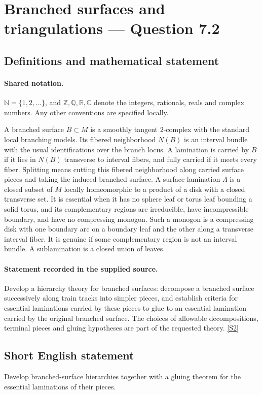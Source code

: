 \documentclass[11pt]{article}
\newcommand{\sref}[2]{\hyperlink{source:#1:#2}{[S#2]}}
\begin{document}
\section{Branched surfaces and triangulations — Question 7.2}\label{statement}

\subsection{Definitions and mathematical statement}

\paragraph{Shared notation.}$\mathbb N=\{1,2,\ldots\}$, and $\mathbb Z,\mathbb Q,\mathbb R,\mathbb C$ denote the integers, rationals, reals and complex numbers. Any other conventions are specified locally.


A branched surface $B\subset M$ is a smoothly tangent $2$-complex with the standard local branching models. Its fibered neighborhood $N(B)$ is an interval bundle with the usual identifications over the branch locus. A lamination is carried by $B$ if it lies in $N(B)$ transverse to interval fibers, and fully carried if it meets every fiber. Splitting means cutting this fibered neighborhood along carried surface pieces and taking the induced branched surface. A surface lamination $\Lambda$ is a closed subset of $M$ locally homeomorphic to a product of a disk with a closed transverse set. It is essential when it has no sphere leaf or torus leaf bounding a solid torus, and its complementary regions are irreducible, have incompressible boundary, and have no compressing monogon. Such a monogon is a compressing disk with one boundary arc on a boundary leaf and the other along a transverse interval fiber. It is genuine if some complementary region is not an interval bundle. A sublamination is a closed union of leaves.
\paragraph{Statement recorded in the supplied source.}
Develop a hierarchy theory for branched surfaces: decompose a branched surface successively along train tracks into simpler pieces, and establish criteria for essential laminations carried by these pieces to glue to an essential lamination carried by the original branched surface. The choices of allowable decompositions, terminal pieces and gluing hypotheses are part of the requested theory. \sref{statement}{2}
\subsection{Short English statement}
Develop branched-surface hierarchies together with a gluing theorem for the essential laminations of their pieces.
\end{document}
